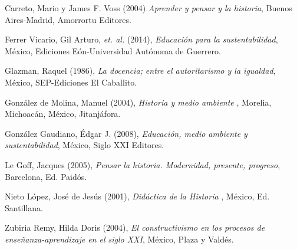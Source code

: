 Carreto, Mario y James F. Voss (2004) \textit{Aprender y pensar y la 
historia}, Buenos Aires-Madrid, Amorrortu Editores.

Ferrer Vicario, Gil Arturo, \textit{et. al. } (2014), \textit{Educación para la sustentabilidad}, México, Ediciones Eón-Universidad Autónoma de Guerrero.

Glazman, Raquel (1986), \textit{La docencia; entre el autoritarismo y la igualdad}, México, SEP-Ediciones El Caballito.

González de Molina, Manuel (2004), \textit{Historia y medio ambiente 
}, Morelia, Michoacán, México, Jitanjáfora.

González Gaudiano, Édgar J. (2008), \textit{Educación, medio ambiente y sustentabilidad}, México, Siglo XXI Editores. 

Le Goff, Jacques (2005), \textit{Pensar la historia. Modernidad, presente, progreso}, Barcelona, Ed. Paidós.

Nieto López, José de Jesús (2001), \textit{Didáctica de la Historia 
}, México, Ed. Santillana.

Zubiria Remy, Hilda Doris (2004), \textit{El constructivismo en los 
procesos de enseñanza-aprendizaje en el siglo XXI}, México, Plaza y 
Valdés.

